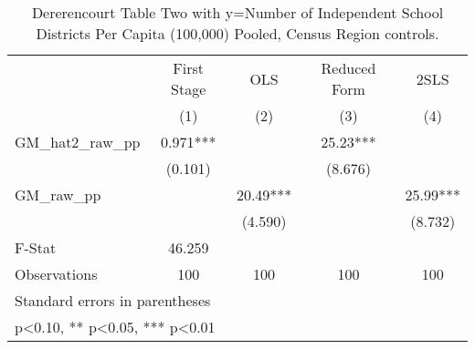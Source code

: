\begin{table}[htbp]\centering
\def\sym#1{\ifmmode^{#1}\else\(^{#1}\)\fi}
\caption{Dererencourt Table Two with y=Number of Independent School Districts Per Capita (100,000) Pooled, Census Region controls.}
\begin{tabular}{l*{4}{c}}
\toprule
                    & First Stage   &         OLS   &Reduced Form   &        2SLS   \\
                    &\multicolumn{1}{c}{(1)}   &\multicolumn{1}{c}{(2)}   &\multicolumn{1}{c}{(3)}   &\multicolumn{1}{c}{(4)}   \\
\midrule
GM\_hat2\_raw\_pp      &       0.971***&               &       25.23***&               \\
                    &     (0.101)   &               &     (8.676)   &               \\
\addlinespace
GM\_raw\_pp           &               &       20.49***&               &       25.99***\\
                    &               &     (4.590)   &               &     (8.732)   \\
\midrule
F-Stat              &      46.259   &               &               &               \\
Observations        &         100   &         100   &         100   &         100   \\
\bottomrule
\multicolumn{5}{l}{\footnotesize Standard errors in parentheses}\\
\multicolumn{5}{l}{\footnotesize * p<0.10, ** p<0.05, *** p<0.01}\\
\end{tabular}
\end{table}
